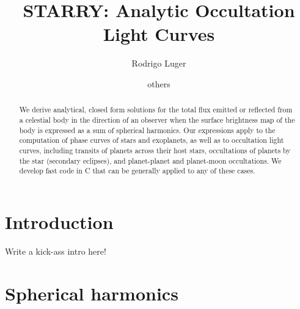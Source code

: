 \documentclass[modern]{aastex61}
\begin{document}
\raggedbottom\sloppy\sloppypar\frenchspacing

\setlength{\abovedisplayskip}{1.5em}
\setlength{\belowdisplayskip}{1.5em}

\title{%
    \textbf{STARRY}: Analytic Occultation Light Curves
}

\author[0000-0002-0296-3826]{Rodrigo Luger}
\author{others}


\begin{abstract}
    We derive analytical, closed form solutions for the total flux
    emitted or reflected from a celestial body in the direction of
    an observer when the surface brightness map of the body is expressed
    as a sum of spherical harmonics.
    Our expressions apply to the computation of phase curves of stars and
    exoplanets, as well as to occultation light curves, including transits of
    planets across their host stars, occultations of planets by the star
    (secondary eclipses), and planet-planet and planet-moon occultations.
    We develop fast code in \textsf{C} that can be generally applied
    to any of these cases.
\end{abstract}

%
\section{Introduction}
\label{sec:intro}

Write a kick-ass intro here! 

\pagebreak
\section{Spherical harmonics}
\label{sec:spharm}
\end{document}
